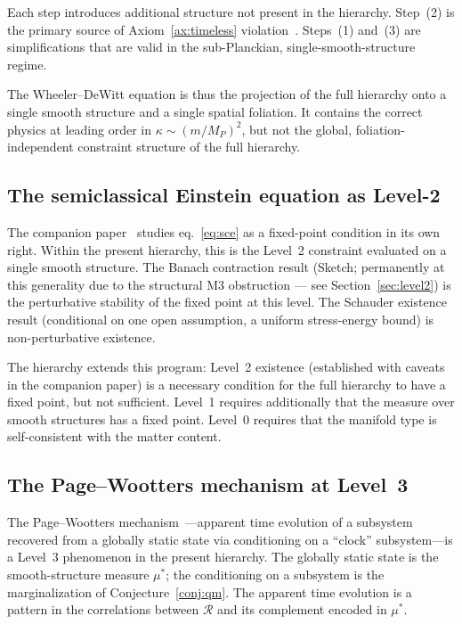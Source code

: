 \documentclass[12pt,a4paper]{article}
\theoremstyle{definition}
\theoremstyle{remark}
\begin{document}
Each step introduces additional structure not present in the hierarchy.
Step~(2) is the primary source of Axiom~\ref{ax:timeless}
violation~\cite{kuchar}. Steps~(1) and~(3) are simplifications that are
valid in the sub-Planckian, single-smooth-structure regime.

The Wheeler--DeWitt equation is thus the projection of the full hierarchy
onto a single smooth structure and a single spatial foliation. It
contains the correct physics at leading order in $\kappa \sim (m/M_P)^2$,
but not the global, foliation-independent constraint structure of the
full hierarchy.

\subsection{The semiclassical Einstein equation as Level-2}

The companion paper~\cite{fixed_point} studies eq.~\eqref{eq:sce} as a
fixed-point condition in its own right. Within the present hierarchy,
this is the Level~2 constraint evaluated on a single smooth structure.
The Banach contraction result (Sketch; permanently at this generality due to
the structural M3 obstruction --- see Section~\ref{sec:level2}) is the
perturbative stability of the fixed point at this
level. The Schauder existence result (conditional on one open assumption,
a uniform stress-energy bound)
is non-perturbative existence.

The hierarchy extends this program: Level~2 existence (established with
caveats in the companion paper) is a necessary condition for the full
hierarchy to have a fixed point, but not sufficient. Level~1 requires
additionally that the measure over smooth structures has a fixed point.
Level~0 requires that the manifold type is self-consistent with the
matter content.

\subsection{The Page--Wootters mechanism at Level~3}

The Page--Wootters mechanism~\cite{page_wootters}---apparent time
evolution of a subsystem recovered from a globally static state via
conditioning on a ``clock'' subsystem---is a Level~3 phenomenon in the
present hierarchy. The globally static state is the smooth-structure
measure $\mu^*$; the conditioning on a subsystem is the marginalization
of Conjecture~\ref{conj:qm}. The apparent time evolution is a pattern
in the correlations between $\mathcal{R}$ and its complement encoded in
$\mu^*$.
\end{document}
